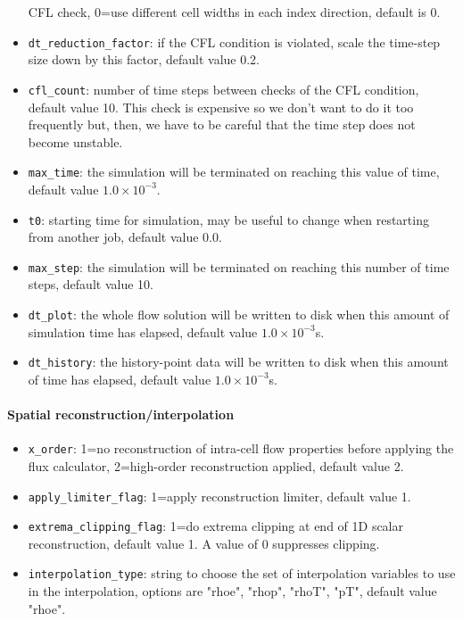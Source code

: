 \documentclass[12pt,a4paper,twoside]{article}
\begin{document}
\begin{itemize}
  CFL check, 0=use different cell widths in each index direction, default is 0.
\item \texttt{dt\_reduction\_factor}\ddag: if the CFL condition is violated, scale the time-step size
  down by this factor, default value 0.2.
\item \texttt{cfl\_count}: number of time steps between checks of the CFL
  condition, default value 10.
  This check is expensive so we don't want to do it too frequently but, then,
  we have to be careful that the time step does not become unstable.
\item \texttt{max\_time}\ddag: the simulation will be terminated on reaching this
  value of time, default value $1.0 \times 10^{-3}$.
\item \texttt{t0}: starting time for simulation, may be useful to change when restarting from another job,
  default value 0.0.
\item \texttt{max\_step}\ddag: the simulation will be terminated on reaching this
  number of time steps, default value 10.
\item \texttt{dt\_plot}\ddag: the whole flow solution will be written to disk when
  this amount of simulation time has elapsed, default value $1.0 \times 10^{-3}$s.
\item \texttt{dt\_history}\ddag: the history-point data will be written to disk
  when this amount of time has elapsed, default value $1.0 \times 10^{-3}$s.
\end{itemize}

\paragraph{Spatial reconstruction/interpolation}
\begin{itemize}
\item \texttt{x\_order}\ddag: 1=no reconstruction of intra-cell flow properties
  before applying the flux calculator, 2=high-order reconstruction applied, 
  default value 2.
\item \texttt{apply\_limiter\_flag}: 1=apply reconstruction limiter, default value 1.
\item \texttt{extrema\_clipping\_flag}: 1=do extrema clipping at end of 1D scalar reconstruction,
  default value 1.  A value of 0 suppresses clipping.
\item \texttt{interpolation\_type}: string to choose the set of interpolation variables
  to use in the interpolation, options are "rhoe", "rhop", "rhoT", "pT", default value "rhoe".
\end{itemize}
\end{document}

